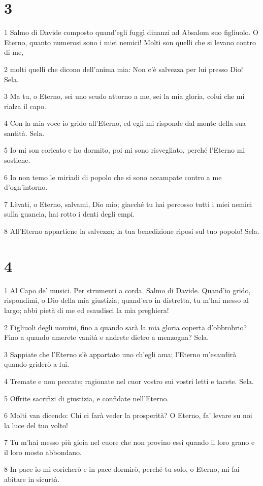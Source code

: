 \chapter{3}

\par 1 Salmo di Davide composto quand'egli fuggì dinanzi ad Absalom suo figliuolo. O Eterno, quanto numerosi sono i miei nemici! Molti son quelli che si levano contro di me,
\par 2 molti quelli che dicono dell'anima mia: Non c'è salvezza per lui presso Dio! Sela.
\par 3 Ma tu, o Eterno, sei uno scudo attorno a me, sei la mia gloria, colui che mi rialza il capo.
\par 4 Con la mia voce io grido all'Eterno, ed egli mi risponde dal monte della sua santità. Sela.
\par 5 Io mi son coricato e ho dormito, poi mi sono risvegliato, perché l'Eterno mi sostiene.
\par 6 Io non temo le miriadi di popolo che si sono accampate contro a me d'ogn'intorno.
\par 7 Lèvati, o Eterno, salvami, Dio mio; giacché tu hai percosso tutti i miei nemici sulla guancia, hai rotto i denti degli empi.
\par 8 All'Eterno appartiene la salvezza; la tua benedizione riposi sul tuo popolo! Sela.

\chapter{4}

\par 1 Al Capo de' musici. Per strumenti a corda. Salmo di Davide. Quand'io grido, rispondimi, o Dio della mia giustizia; quand'ero in distretta, tu m'hai messo al largo; abbi pietà di me ed esaudisci la mia preghiera!
\par 2 Figliuoli degli uomini, fino a quando sarà la mia gloria coperta d'obbrobrio? Fino a quando amerete vanità e andrete dietro a menzogna? Sela.
\par 3 Sappiate che l'Eterno s'è appartato uno ch'egli ama; l'Eterno m'esaudirà quando griderò a lui.
\par 4 Tremate e non peccate; ragionate nel cuor vostro sui vostri letti e tacete. Sela.
\par 5 Offrite sacrifizi di giustizia, e confidate nell'Eterno.
\par 6 Molti van dicendo: Chi ci farà veder la prosperità? O Eterno, fa' levare su noi la luce del tuo volto!
\par 7 Tu m'hai messo più gioia nel cuore che non provino essi quando il loro grano e il loro mosto abbondano.
\par 8 In pace io mi coricherò e in pace dormirò, perché tu solo, o Eterno, mi fai abitare in sicurtà.

